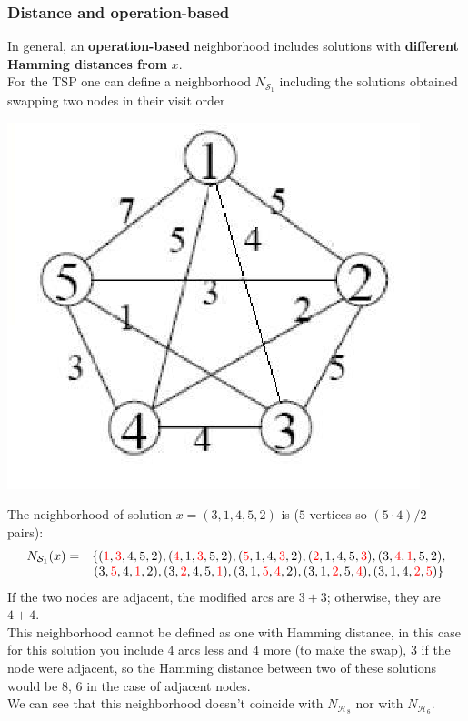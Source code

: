 \newpage

\subsubsection{Distance and operation-based}

In general, an \textbf{operation-based} neighborhood includes solutions with \textbf{different Hamming distances from} $x$.\\

For the TSP one can define a neighborhood $N_{\mathcal{S}_1}$ including the solutions obtained swapping two nodes in their visit order

\begin{center}
	\includegraphics[width=0.5\columnwidth]{img/TSP2}
\end{center}

The neighborhood of solution $x = (3, 1, 4, 5, 2)$ is ($5$ vertices so $(5 \cdot 4) / 2$ pairs):
$$ \begin{array}{c c}
	N_{\mathcal{S}_1} (x) = & \{({\color{red} 1}, {\color{red} 3}, 4, 5, 2) , ({\color{red} 4}, 1, {\color{red} 3}, 5, 2) , ({\color{red} 5}, 1, 4, {\color{red} 3}, 2) , ({\color{red} 2}, 1, 4, 5, {\color{red} 3}) , (3, {\color{red} 4}, {\color{red} 1}, 5, 2) , \\
	& (3, {\color{red} 5}, 4, {\color{red} 1}, 2) , (3, {\color{red} 2}, 4, 5, {\color{red} 1}) , (3, 1, {\color{red} 5}, {\color{red} 4}, 2) , (3, 1, {\color{red} 2}, 5, {\color{red} 4}) , (3, 1, 4, {\color{red} 2}, {\color{red} 5}) \}
\end{array} $$
If the two nodes are adjacent, the modified arcs are $3 + 3$; otherwise, they are $4 + 4$.\\

This neighborhood cannot be defined as one with Hamming distance, in this case for this solution you include $4$ arcs less and $4$ more (to make the swap), $3$ if the node were adjacent, so the Hamming distance between two of these solutions would be $8$, $6$ in the case of adjacent nodes.\\
We can see that this neighborhood doesn't coincide with $N_{\mathcal{H}_8}$ nor with $N_{\mathcal{H}_6}$.\\

